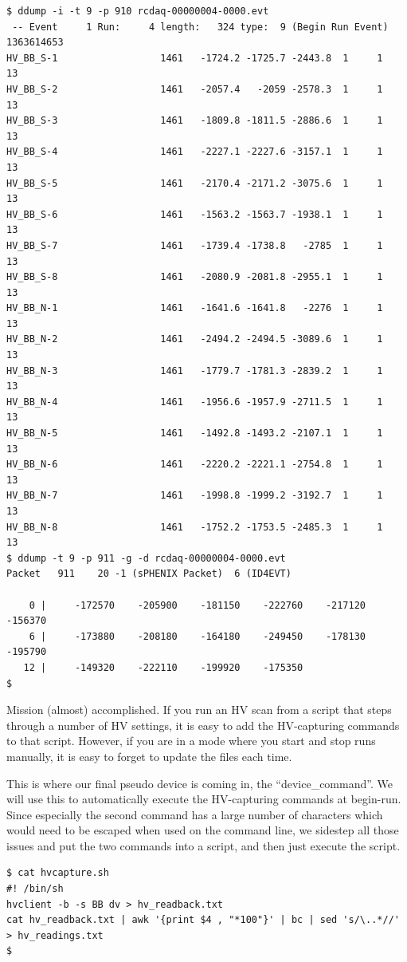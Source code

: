 \documentclass{article}[11pt]
\begin{document}
\begin{verbatim}
$ ddump -i -t 9 -p 910 rcdaq-00000004-0000.evt
 -- Event     1 Run:     4 length:   324 type:  9 (Begin Run Event)  1363614653
HV_BB_S-1                  1461   -1724.2 -1725.7 -2443.8  1     1    13
HV_BB_S-2                  1461   -2057.4   -2059 -2578.3  1     1    13
HV_BB_S-3                  1461   -1809.8 -1811.5 -2886.6  1     1    13
HV_BB_S-4                  1461   -2227.1 -2227.6 -3157.1  1     1    13
HV_BB_S-5                  1461   -2170.4 -2171.2 -3075.6  1     1    13
HV_BB_S-6                  1461   -1563.2 -1563.7 -1938.1  1     1    13
HV_BB_S-7                  1461   -1739.4 -1738.8   -2785  1     1    13
HV_BB_S-8                  1461   -2080.9 -2081.8 -2955.1  1     1    13
HV_BB_N-1                  1461   -1641.6 -1641.8   -2276  1     1    13
HV_BB_N-2                  1461   -2494.2 -2494.5 -3089.6  1     1    13
HV_BB_N-3                  1461   -1779.7 -1781.3 -2839.2  1     1    13
HV_BB_N-4                  1461   -1956.6 -1957.9 -2711.5  1     1    13
HV_BB_N-5                  1461   -1492.8 -1493.2 -2107.1  1     1    13
HV_BB_N-6                  1461   -2220.2 -2221.1 -2754.8  1     1    13
HV_BB_N-7                  1461   -1998.8 -1999.2 -3192.7  1     1    13
HV_BB_N-8                  1461   -1752.2 -1753.5 -2485.3  1     1    13
$ ddump -t 9 -p 911 -g -d rcdaq-00000004-0000.evt
Packet   911    20 -1 (sPHENIX Packet)  6 (ID4EVT)

    0 |     -172570    -205900    -181150    -222760    -217120    -156370 
    6 |     -173880    -208180    -164180    -249450    -178130    -195790 
   12 |     -149320    -222110    -199920    -175350 
$ 
\end{verbatim}

Mission (almost) accomplished. If you run an HV scan from a script
that steps through a number of HV settings, it is easy to add the
HV-capturing commands to that script.  However, if you are in a mode
where you start and stop runs manually, it is easy to forget to update
the files each time.

This is where our final pseudo device is coming in, the
``device\_command''. We will use this to automatically execute the
HV-capturing commands at begin-run. Since especially the second
command has a large number of characters which would need to be
escaped when used on the command line, we sidestep all those issues
and put the two commands into a script, and then just execute the
script.

\begin{verbatim}
$ cat hvcapture.sh
#! /bin/sh
hvclient -b -s BB dv > hv_readback.txt
cat hv_readback.txt | awk '{print $4 , "*100"}' | bc | sed 's/\..*//' > hv_readings.txt
$ 
\end{verbatim}
\end{document}
